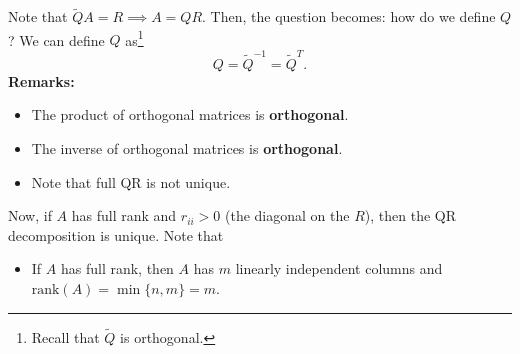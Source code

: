 \documentclass[letterpaper]{article}
\newcommand{\0}{\mathbf{0}}
\begin{document}
Note that $\tilde{Q}A = R \implies A = QR$. Then, the question becomes: how do we define $Q$? We can define $Q$ as\footnote{Recall that $\tilde{Q}$ is orthogonal.} \[Q = \tilde{Q}^{-1} = \tilde{Q}^{T}.\] 
\textbf{Remarks:}
\begin{itemize}
    \item The product of orthogonal matrices is \textbf{orthogonal}.
    \item The inverse of orthogonal matrices is \textbf{orthogonal}.
    \item Note that full QR is not unique.
\end{itemize}
Now, if $A$ has full rank and $r_{ii} > 0$ (the diagonal on the $R$), then the QR decomposition is unique. Note that 
\begin{itemize}
    \item If $A$ has full rank, then $A$ has $m$ linearly independent columns and $\text{rank}(A) = \min\{n, m\} = m$.
\end{itemize}
\end{document}
